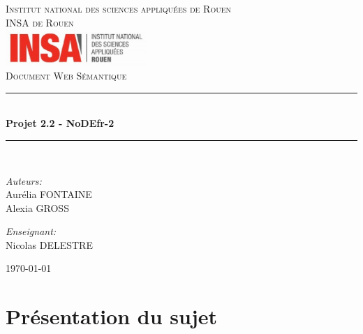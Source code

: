 \documentclass[11pt]{report}
\newcommand{\HRule}{\rule{\linewidth}{0.5mm}}
\begin{document}
\begin{titlepage}

\begin{center}

\textsc{{\LARGE Institut national des sciences appliquées de Rouen} \\ \vspace{6
    mm} {\Large INSA de Rouen}} \\
\vspace{15mm}
\includegraphics[width=0.4\textwidth]{./insa}\\[1.0 cm]

\textsc{\Large Document Web Sémantique}\\[0.5cm]


\HRule \\[0.4cm]
{ \huge \bfseries Projet 2.2 - NoDEfr-2}\\[0.4cm]

\HRule \\[1.5cm]

\vspace{1.5cm}
\begin{minipage}{0.4\textwidth}
\begin{flushleft} \large
\emph{Auteurs:}\\
Aurélia \textsc{FONTAINE}
\\
Alexia \textsc{GROSS}
\end{flushleft}
\end{minipage}
\begin{minipage}{0.4\textwidth}
\begin{flushright} \large
\emph{Enseignant:} \\
Nicolas \textsc{DELESTRE} 
\end{flushright}
\end{minipage}

\vfill
{\large \today}
\end{center}
\end{titlepage} 


\tableofcontents

\chapter{Présentation du sujet}
\end{document}
